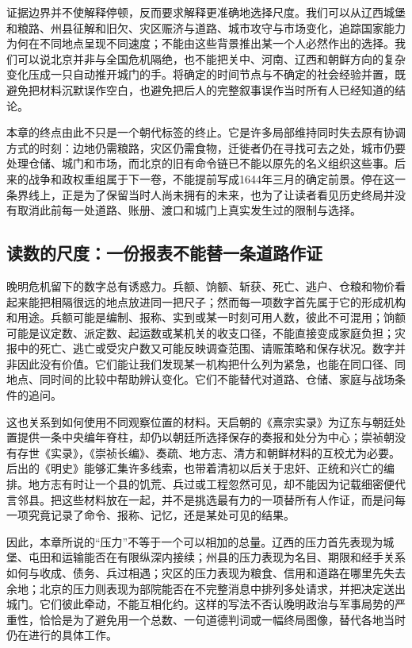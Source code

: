 证据边界并不使解释停顿，反而要求解释更准确地选择尺度。我们可以从辽西城堡和粮路、州县征解和旧欠、灾区赈济与道路、城市攻守与市场变化，追踪国家能力为何在不同地点呈现不同速度；不能由这些背景推出某一个人必然作出的选择。我们可以说北京并非与全国危机隔绝，也不能把关中、河南、辽西和朝鲜方向的复杂变化压成一只自动推开城门的手。将确定的时间节点与不确定的社会经验并置，既避免把材料沉默误作空白，也避免把后人的完整叙事误作当时所有人已经知道的结论。

本章的终点由此不只是一个朝代标签的终止。它是许多局部维持同时失去原有协调方式的时刻：边地仍需粮路，灾区仍需食物，迁徙者仍在寻找可去之处，城市仍要处理仓储、城门和市场，而北京的旧有命令链已不能以原先的名义组织这些事。后来的战争和政权重组属于下一卷，不能提前写成1644年三月的确定前景。停在这一条界线上，正是为了保留当时人尚未拥有的未来，也为了让读者看见历史终局并没有取消此前每一处道路、账册、渡口和城门上真实发生过的限制与选择。

\subsection{读数的尺度：一份报表不能替一条道路作证}

晚明危机留下的数字总有诱惑力。兵额、饷额、斩获、死亡、逃户、仓粮和物价看起来能把相隔很远的地点放进同一把尺子；然而每一项数字首先属于它的形成机构和用途。兵额可能是编制、报称、实到或某一时刻可用人数，彼此不可混用；饷额可能是议定数、派定数、起运数或某机关的收支口径，不能直接变成家庭负担；灾报中的死亡、逃亡或受灾户数又可能反映调查范围、请赈策略和保存状况。数字并非因此没有价值。它们能让我们发现某一机构把什么列为紧急，也能在同口径、同地点、同时间的比较中帮助辨认变化。它们不能替代对道路、仓储、家庭与战场条件的追问。

这也关系到如何使用不同观察位置的材料。天启朝的《熹宗实录》为辽东与朝廷处置提供一条中央编年脊柱，却仍以朝廷所选择保存的奏报和处分为中心；崇祯朝没有存世《实录》，《崇祯长编》、奏疏、地方志、清方和朝鲜材料的互校尤为必要。后出的《明史》能够汇集许多线索，也带着清初以后关于忠奸、正统和兴亡的编排。地方志有时让一个县的饥荒、兵过或工程忽然可见，却不能因为记载细密便代言邻县。把这些材料放在一起，并不是挑选最有力的一项替所有人作证，而是问每一项究竟记录了命令、报称、记忆，还是某处可见的结果。

因此，本章所说的“压力”不等于一个可以相加的总量。辽西的压力首先表现为城堡、屯田和运输能否在有限纵深内接续；州县的压力表现为名目、期限和经手关系如何与收成、债务、兵过相遇；灾区的压力表现为粮食、信用和道路在哪里先失去余地；北京的压力则表现为部院能否在不完整消息中排列多处请求，并把决定送出城门。它们彼此牵动，不能互相化约。这样的写法不否认晚明政治与军事局势的严重性，恰恰是为了避免用一个总数、一句道德判词或一幅终局图像，替代各地当时仍在进行的具体工作。

